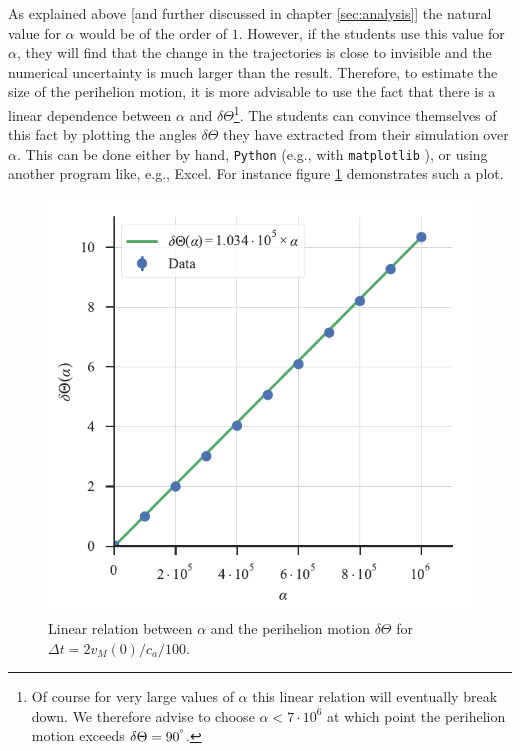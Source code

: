 \documentclass[12pt,ngerman,american]{iopart}
\newcommand{\python}[0]{\texttt{Python}}
\begin{document}
As explained above [and further discussed in chapter \ref{sec:analysis}] the natural value for $\alpha$ would be of the order of $1$.
However, if the students use this value for $\alpha$, they will find that the change in the trajectories is close to invisible and the numerical uncertainty is much larger than the result.
Therefore, to estimate the size of the perihelion motion, it is more advisable to use the fact that there is a linear dependence between $\alpha$ and $\delta \Theta$\footnote{%
	Of course for very large values of $\alpha$ this linear relation will eventually break down.
	We therefore advise to choose $\alpha<7\cdot 10^6$ at which point the perihelion motion exceeds $\delta \Theta=90^{\degree}$.
}.
The students can convince themselves of this fact by plotting the angles $\delta \Theta$ they have extracted from their simulation over $\alpha$.
This can be done either by hand, \python{} (e.g., with \texttt{matplotlib} \cite{Matplotlib}), or using another program like, e.g., Excel.
For instance figure \ref{fig:AlphaAngle} demonstrates such a plot.

\begin{figure}[htb]
	\centering
	\includegraphics{figs/alpha-angle.pdf}
	\caption{\label{fig:AlphaAngle} Linear relation between $\alpha$ and the perihelion motion $\delta \Theta$ for $\Delta t=2v_M(0)/c_a/100$.}
\end{figure}
\end{document}
